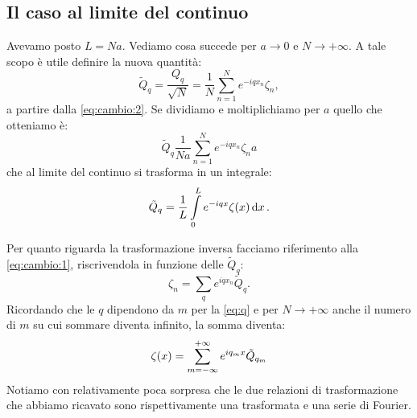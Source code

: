     \subsection{Il caso al limite del continuo}
        Avevamo posto $L=Na$. Vediamo cosa succede per $a\rightarrow 0$ e $N\rightarrow+\infty$. A tale scopo \`e utile definire la nuova quantit\`a:
            $$\tilde{Q}_q=\frac{Q_q}{\sqrt{N}}=\frac{1}{N}\sum_{n=1}^Ne^{-iqx_n}\zeta_n,$$
        a partire dalla \eqref{eq:cambio:2}. Se dividiamo e moltiplichiamo per $a$ quello che otteniamo \`e:
            $$\tilde{Q}_q\frac{1}{Na}\sum_{n=1}^Ne^{-iqx_n}\zeta_na$$
        che al limite del continuo si trasforma in un integrale:
        \begin{equation}
            \tilde{Q}_q=\frac{1}{L}\int\limits_0^Le^{-iqx}\zeta\qty(x)\dd{x}.
            \label{eq:cambiocontinuo:1}
        \end{equation}
        \par Per quanto riguarda la trasformazione inversa facciamo riferimento alla \eqref{eq:cambio:1}, riscrivendola in funzione delle $\tilde{Q}_q$:
            $$\zeta_n=\sum_qe^{iqx_n}\tilde{Q}_q.$$
        Ricordando che le $q$ dipendono da $m$ per la \eqref{eq:q} e per $N\rightarrow+\infty$ anche il numero di $m$ su cui sommare diventa infinito, la somma diventa:
        \begin{equation}
            \zeta\qty(x)=\sum_{m=-\infty}^{+\infty}e^{iq_mx}\tilde{Q}_{q_m}
            \label{eq:cambiocontinuo:2}
        \end{equation}
        Notiamo con relativamente poca sorpresa che le due relazioni di trasformazione che abbiamo ricavato sono rispettivamente una trasformata e una serie di Fourier.
    